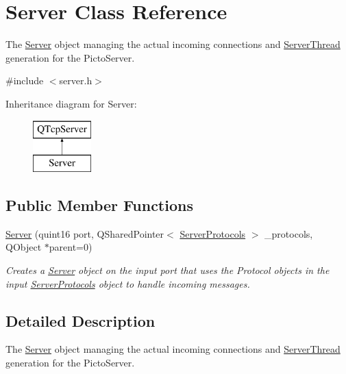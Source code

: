 \hypertarget{class_server}{\section{Server Class Reference}
\label{class_server}
}


The \hyperlink{class_server}{Server} object managing the actual incoming connections and \hyperlink{class_server_thread}{Server\-Thread} generation for the Picto\-Server.  




{\ttfamily \#include $<$server.\-h$>$}

Inheritance diagram for Server\-:\begin{figure}[H]
\begin{center}
\leavevmode
\includegraphics[height=2.000000cm]{class_server}
\end{center}
\end{figure}
\subsection*{Public Member Functions}
\begin{DoxyCompactItemize}
\item 
\hyperlink{class_server_a48f04a181844fc1610e16bd4b9e5c190}{Server} (quint16 port, Q\-Shared\-Pointer$<$ \hyperlink{struct_server_protocols}{Server\-Protocols} $>$ \-\_\-protocols, Q\-Object $\ast$parent=0)
\begin{DoxyCompactList}\small\item\em Creates a \hyperlink{class_server}{Server} object on the input port that uses the Protocol objects in the input \hyperlink{struct_server_protocols}{Server\-Protocols} object to handle incoming messages. \end{DoxyCompactList}\end{DoxyCompactItemize}


\subsection{Detailed Description}
The \hyperlink{class_server}{Server} object managing the actual incoming connections and \hyperlink{class_server_thread}{Server\-Thread} generation for the Picto\-Server. 

